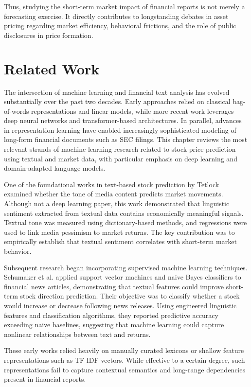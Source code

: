 Thus, studying the short-term market impact of financial reports is not merely a forecasting exercise. It directly contributes to longstanding debates in asset pricing regarding market efficiency, behavioral frictions, and the role of public disclosures in price formation.

\section{Related Work}

The intersection of machine learning and financial text analysis has evolved substantially over the past two decades. Early approaches relied on classical bag-of-words representations and linear models, while more recent work leverages deep neural networks and transformer-based architectures. In parallel, advances in representation learning have enabled increasingly sophisticated modeling of long-form financial documents such as SEC filings. This chapter reviews the most relevant strands of machine learning research related to stock price prediction using textual and market data, with particular emphasis on deep learning and domain-adapted language models.

One of the foundational works in text-based stock prediction by Tetlock\cite{tetlock2007giving} examined whether the tone of media content predicts market movements. Although not a deep learning paper, this work demonstrated that linguistic sentiment extracted from textual data contains economically meaningful signals. Textual tone was measured using dictionary-based methods, and regressions were used to link media pessimism to market returns. The key contribution was to empirically establish that textual sentiment correlates with short-term market behavior.

Subsequent research began incorporating supervised machine learning techniques. Schumaker et al.\cite{schumaker2009textual} applied support vector machines and naive Bayes classifiers to financial news articles, demonstrating that textual features could improve short-term stock direction prediction. Their objective was to classify whether a stock would increase or decrease following news releases. Using engineered linguistic features and classification algorithms, they reported predictive accuracy exceeding naive baselines, suggesting that machine learning could capture nonlinear relationships between text and returns.

These early works relied heavily on manually curated lexicons or shallow feature representations such as TF-IDF vectors. While effective to a certain degree, such representations fail to capture contextual semantics and long-range dependencies present in financial reports.


